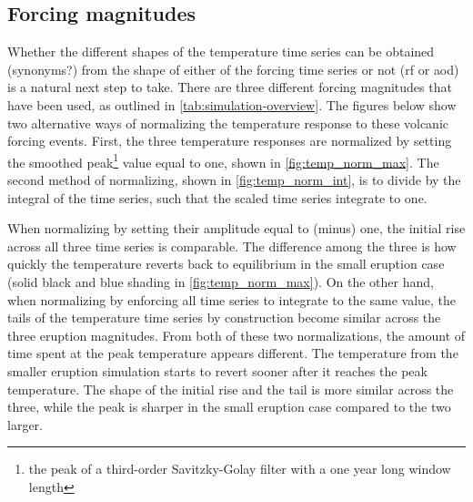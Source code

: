 \documentclass{ametsocV5}
\begin{document}
\subsection{Forcing magnitudes}

Whether the different shapes of the temperature time series can be obtained (synonyms?)
from the shape of either of the forcing time series or not (\ac{rf} or \ac{aod}) is a
natural next step to take. There are three different forcing magnitudes that have been
used, as outlined in \cref{tab:simulation-overview}. The figures below show two
alternative ways of normalizing the temperature response to these volcanic forcing
events. First, the three temperature responses are normalized by setting the smoothed
peak\footnote{the peak of a third-order Savitzky-Golay filter with a one year long
  window length} value equal to one, shown in \cref{fig:temp_norm_max}. The second method
of normalizing, shown in \cref{fig:temp_norm_int}, is to divide by the integral of the
time series, such that the scaled time series integrate to one.

When normalizing by setting their amplitude equal to (minus) one, the initial rise
across all three time series is comparable. The difference among the three is how
quickly the temperature reverts back to equilibrium in the small eruption case (solid
black and blue shading in \cref{fig:temp_norm_max}). On the other hand, when normalizing
by enforcing all time series to integrate to the same value, the tails of the
temperature time series by construction become similar across the three eruption
magnitudes. From both of these two normalizations, the amount of time spent at the peak
temperature appears different. The temperature from the smaller eruption simulation
starts to revert sooner after it reaches the peak temperature. The shape of the initial
rise and the tail is more similar across the three, while the peak is sharper in the
small eruption case compared to the two larger.

\end{document}
